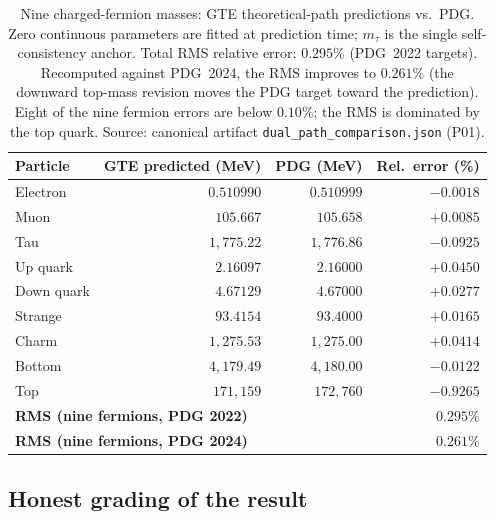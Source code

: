\documentclass[11pt,a4paper]{article}
\begin{document}
\begin{table}[htbp]
\centering
\caption{Nine charged-fermion masses: GTE theoretical-path predictions vs.\ PDG.
Zero continuous parameters are fitted at prediction time; $m_\tau$ is the
single self-consistency anchor.  Total RMS relative error: $\mathbf{0.295\%}$
(PDG~2022 targets).  Recomputed against PDG~2024, the RMS improves to
$\mathbf{0.261\%}$ (the downward top-mass revision moves the PDG target toward
the prediction).  Eight of the nine fermion errors are below $0.10\%$; the
RMS is dominated by the top quark.
Source: canonical artifact \texttt{dual\_path\_comparison.json} (P01).}
\label{tab:nine_fermions}
\renewcommand{\arraystretch}{1.12}
\begin{tabular}{@{}lrrr@{}}
\toprule
\textbf{Particle} & \textbf{GTE predicted (MeV)} & \textbf{PDG (MeV)} & \textbf{Rel.\ error (\%)} \\
\midrule
Electron    & $0.510990$       & $0.510999$       & $-0.0018$ \\
Muon        & $105.667$        & $105.658$        & $+0.0085$ \\
Tau         & $1{,}775.22$     & $1{,}776.86$     & $-0.0925$ \\
\midrule
Up quark    & $2.16097$        & $2.16000$        & $+0.0450$ \\
Down quark  & $4.67129$        & $4.67000$        & $+0.0277$ \\
Strange     & $93.4154$        & $93.4000$        & $+0.0165$ \\
Charm       & $1{,}275.53$     & $1{,}275.00$     & $+0.0414$ \\
Bottom      & $4{,}179.49$     & $4{,}180.00$     & $-0.0122$ \\
Top         & $171{,}159$      & $172{,}760$      & $-0.9265$ \\
\midrule
\multicolumn{3}{l}{\textbf{RMS (nine fermions, PDG 2022)}} & $\mathbf{0.295\%}$ \\
\multicolumn{3}{l}{\textbf{RMS (nine fermions, PDG 2024)}} & $\mathbf{0.261\%}$ \\
\bottomrule
\end{tabular}
\end{table}

\subsection{Honest grading of the result}
\end{document}
